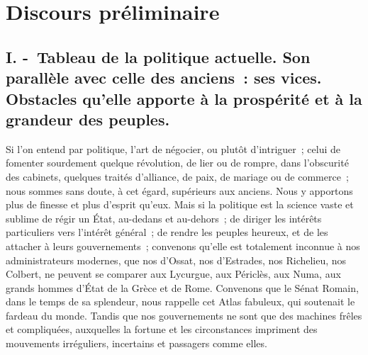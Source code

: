 \documentclass[french,twoside]{book} %
\begin{document}
\section[{Discours préliminaire}]{Discours préliminaire}\renewcommand{\leftmark}{Discours préliminaire}

\subsection[{I. - Tableau de la politique actuelle. Son parallèle avec celle des anciens : ses vices. Obstacles qu’elle apporte à la prospérité et à la grandeur des peuples.}]{I. - Tableau de la politique actuelle. Son parallèle avec celle des anciens : ses vices. Obstacles qu’elle apporte à la prospérité et à la grandeur des peuples.}
\noindent Si l’on entend par politique, l’art de négocier, ou plutôt d’intriguer ; celui de fomenter sourdement quelque révolution, de lier ou de rompre, dans l’obscurité des cabinets, quelques traités d’alliance, de paix, de mariage ou de commerce ; nous sommes sans doute, à cet égard, supérieurs aux anciens. Nous y apportons plus de finesse et plus d’esprit qu’eux. Mais si la politique est la science vaste et sublime de régir un État, au-dedans et au-dehors ; de diriger les intérêts particuliers vers l’intérêt général ; de rendre les peuples heureux, et de les attacher à leurs gouvernements ; convenons qu’elle est totalement inconnue à nos administrateurs modernes, que nos d’Ossat, nos d’Estrades, nos Richelieu, nos Colbert, ne peuvent se comparer aux Lycurgue, aux Périclès, aux Numa, aux grands hommes d’État de la Grèce et de Rome. Convenons que le Sénat Romain, dans le temps de sa splendeur, nous rappelle cet Atlas fabuleux, qui soutenait le fardeau du monde. Tandis que nos gouvernements ne sont que des machines frêles et compliquées, auxquelles la fortune et les circonstances impriment des mouvements irréguliers, incertains et passagers comme elles.\par
\end{document}

